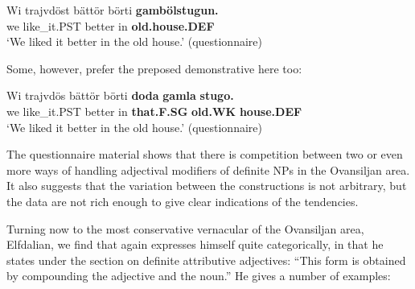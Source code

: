 {\ea\label{}
\gll Wi  trajvdöst  bättör  börti  \textbf{gambölstugun.}\\
we  like\_it.PST  better  in  \textbf{old.house.DEF}\\
\glt ‘We liked it better in the old house.’ (questionnaire)
\z

Some, however, prefer the preposed demonstrative here too:


\ea\label{}
\gll Wi  trajvdös  bättör  börti  \textbf{doda} \textbf{gamla} \textbf{stugo.}\\
we  like\_it.PST  better  in  \textbf{that.F.SG} \textbf{old.WK} \textbf{house.DEF}\\
\glt ‘We liked it better in the old house.’ (questionnaire)
\z

The questionnaire material shows that there is competition between two or even more ways of handling adjectival modifiers of definite NPs in the Ovansiljan area. It also suggests that the variation between the constructions is not arbitrary, but the data are not rich enough to give clear indications of the tendencies. 


Turning now to the most conservative vernacular of the Ovansiljan area, Elfdalian, we find that \citet[53]{Levander1909} again expresses himself quite categorically, in that he states under the section on definite attributive adjectives: “This form is obtained by compounding the adjective and the noun.” He gives a number of examples:


\ea\label{}



}
